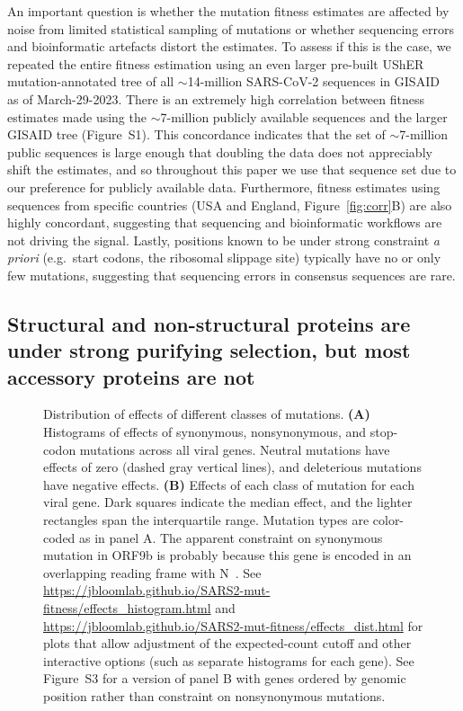 \documentclass[9pt,twocolumn,twoside]{gsajnl_modified}
\begin{document}
An important question is whether the mutation fitness estimates are affected by noise from limited statistical sampling of mutations or whether sequencing errors and bioinformatic artefacts distort the estimates.
To assess if this is the case, we repeated the entire fitness estimation using an even larger pre-built UShER mutation-annotated tree of all $\sim$14-million SARS-CoV-2 sequences in GISAID~\cite{shu2017gisaid} as of March-29-2023.
There is an extremely high correlation between fitness estimates made using the $\sim$7-million publicly available sequences and the larger GISAID tree (Figure~S1).
This concordance indicates that the set of $\sim$7-million public sequences is large enough that doubling the data does not appreciably shift the estimates, and so throughout this paper we use that sequence set due to our preference for publicly available data.
Furthermore, fitness estimates using sequences from specific countries (USA and England, Figure~\ref{fig:corr}B) are also highly concordant, suggesting that sequencing and bioinformatic workflows are not driving the signal.
Lastly, positions known to be under strong constraint {\it a priori} (e.g.~start codons, the ribosomal slippage site) typically have no or only few mutations, suggesting that sequencing errors in consensus sequences are rare.

\subsection*{Structural and non-structural proteins are under strong purifying selection, but most accessory proteins are not}

\begin{figure}
\caption{
Distribution of effects of different classes of mutations.
{\bf (A)}
Histograms of effects of synonymous, nonsynonymous, and stop-codon mutations across all viral genes.
Neutral mutations have effects of zero (dashed gray vertical lines), and deleterious mutations have negative effects.
{\bf (B)}
Effects of each class of mutation for each viral gene.
Dark squares indicate the median effect, and the lighter rectangles span the interquartile range.
Mutation types are color-coded as in panel A.
The apparent constraint on synonymous mutation in ORF9b is probably because this gene is encoded in an overlapping reading frame with N~\cite{jungreis2021conflicting}.
See \url{https://jbloomlab.github.io/SARS2-mut-fitness/effects_histogram.html} and \url{https://jbloomlab.github.io/SARS2-mut-fitness/effects_dist.html} for plots that allow adjustment of the expected-count cutoff and other interactive options (such as separate histograms for each gene).
See Figure~S3 for a version of panel B with genes ordered by genomic position rather than constraint on nonsynonymous mutations.
\label{fig:dist}
}
\end{figure}
\end{document}
